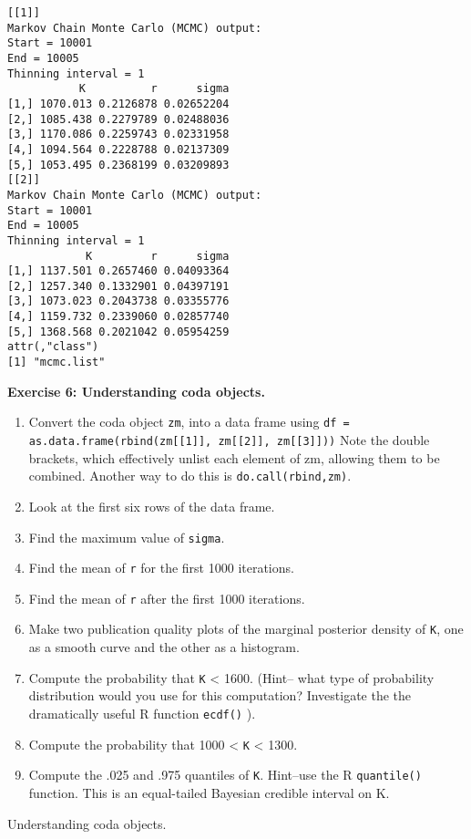 \documentclass[12pt,english]{article}
\begin{document}
\begin{Verbatim}[fontsize=\small]
[[1]]
Markov Chain Monte Carlo (MCMC) output:
Start = 10001
End = 10005
Thinning interval = 1
           K          r      sigma
[1,] 1070.013 0.2126878 0.02652204
[2,] 1085.438 0.2279789 0.02488036
[3,] 1170.086 0.2259743 0.02331958
[4,] 1094.564 0.2228788 0.02137309
[5,] 1053.495 0.2368199 0.03209893
[[2]]
Markov Chain Monte Carlo (MCMC) output:
Start = 10001
End = 10005
Thinning interval = 1
            K         r      sigma
[1,] 1137.501 0.2657460 0.04093364
[2,] 1257.340 0.1332901 0.04397191
[3,] 1073.023 0.2043738 0.03355776
[4,] 1159.732 0.2339060 0.02857740
[5,] 1368.568 0.2021042 0.05954259
attr(,"class")
[1] "mcmc.list"
\end{Verbatim}

\belowcaptionskip=-30pt
\begin{exercise}

\begin{mdframed}
\doublespacing
\textbf{Exercise 6: Understanding coda objects.}
\begin{enumerate}
\item Convert the coda object \texttt{zm}, into a data frame using \texttt{df = as.data.frame(rbind(zm[[1]], zm[[2]], zm[[3]]))}  Note the double brackets, which effectively unlist each element of zm, allowing them to be combined. Another way to do this is \texttt{do.call(rbind,zm)}.
\item Look at the first six rows of the data frame.
\item Find the maximum value of \texttt{sigma}.
\item Find the mean of \texttt{r} for the first 1000 iterations.
\item Find the mean of \texttt{r} after the first 1000 iterations.
\item Make two publication quality plots of the marginal posterior density of \texttt{K}, one as a smooth curve and the other as a histogram.
\item Compute the probability that \texttt{K} < 1600. (Hint-- what type of probability distribution would you use for this computation?  Investigate the the dramatically useful R function \texttt{ecdf()} ).
\item Compute the probability that 1000 < \texttt{K} < 1300.
\item Compute the .025 and .975 quantiles of \texttt{K}.  Hint--use the R \texttt{quantile()} function. This is an equal-tailed Bayesian credible interval on K.
\end{enumerate}
\end{mdframed}
\captionsetup{textformat=empty, labelformat=empty}
\caption[Understanding coda objects]{Understanding coda objects.}
\label{ex:coda understanding}
\end{exercise}
\belowcaptionskip=0pt
\end{document}
